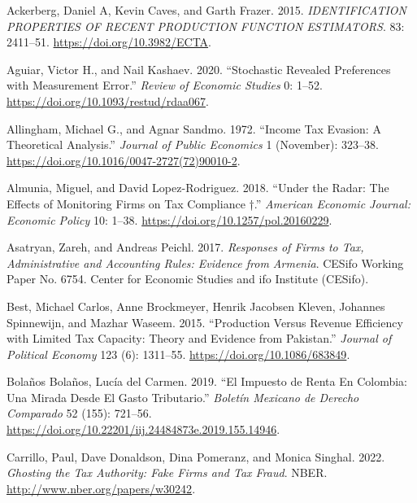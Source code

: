 \documentclass[
  12pt,
  letterpaper,
  oneside,
  openany]{report}
\newlength{\cslhangindent}
\newenvironment{CSLReferences}[2] %
 {\begin{list}{}{%
  \setlength{\itemindent}{0pt}
  \setlength{\leftmargin}{0pt}
  \setlength{\parsep}{0pt}
  \ifodd #1
   \setlength{\leftmargin}{\cslhangindent}
   \setlength{\itemindent}{-1\cslhangindent}
  \fi
  \setlength{\itemsep}{#2\baselineskip}}}
 {\end{list}}
\begin{document}

\protect{}\label{refs}
\begin{CSLReferences}{1}{1}
Ackerberg, Daniel A, Kevin Caves, and Garth Frazer. 2015.
\emph{IDENTIFICATION PROPERTIES OF RECENT PRODUCTION FUNCTION
ESTIMATORS}. 83: 2411--51. \url{https://doi.org/10.3982/ECTA}.

Aguiar, Victor H., and Nail Kashaev. 2020. {``Stochastic Revealed
Preferences with Measurement Error.''} \emph{Review of Economic Studies}
0: 1--52. \url{https://doi.org/10.1093/restud/rdaa067}.

Allingham, Michael G., and Agnar Sandmo. 1972. {``Income Tax Evasion: A
Theoretical Analysis.''} \emph{Journal of Public Economics} 1
(November): 323--38. \url{https://doi.org/10.1016/0047-2727(72)90010-2}.

Almunia, Miguel, and David Lopez-Rodriguez. 2018. {``Under the Radar:
The Effects of Monitoring Firms on Tax Compliance †.''} \emph{American
Economic Journal: Economic Policy} 10: 1--38.
\url{https://doi.org/10.1257/pol.20160229}.

Asatryan, Zareh, and Andreas Peichl. 2017. \emph{Responses of Firms to
Tax, Administrative and Accounting Rules: Evidence from {Armenia}}.
CESifo Working Paper No. 6754. {Center for Economic Studies and ifo
Institute (CESifo)}.

Best, Michael Carlos, Anne Brockmeyer, Henrik Jacobsen Kleven, Johannes
Spinnewijn, and Mazhar Waseem. 2015. {``Production Versus Revenue
Efficiency with Limited Tax Capacity: Theory and Evidence from
{Pakistan}.''} \emph{Journal of Political Economy} 123 (6): 1311--55.
\url{https://doi.org/10.1086/683849}.

Bolaños Bolaños, Lucía del Carmen. 2019. {``El Impuesto de Renta En
{Colombia}: Una Mirada Desde El Gasto Tributario.''} \emph{Bolet{í}n
Mexicano de Derecho Comparado} 52 (155): 721--56.
\url{https://doi.org/10.22201/iij.24484873e.2019.155.14946}.

Carrillo, Paul, Dave Donaldson, Dina Pomeranz, and Monica Singhal. 2022.
\emph{Ghosting the Tax Authority: Fake Firms and Tax Fraud}. NBER.
\url{http://www.nber.org/papers/w30242}.


\end{CSLReferences}
\end{document}
